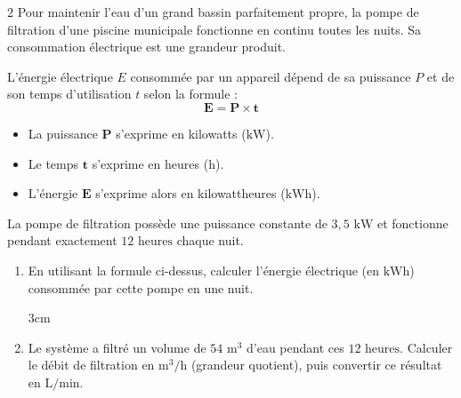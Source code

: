 \documentclass[a4paper]{book}
\begin{document}
{\newpage
    
    
    \begin{exerciceNote}{2}
        Pour maintenir l'eau d'un grand bassin parfaitement propre, la pompe de filtration d'une piscine municipale fonctionne en continu toutes les nuits. Sa consommation électrique est une grandeur produit.
        
        \begin{center}
        \begin{minipage}{0.8\textwidth}
            \begin{tcolorbox}[colback=gray!5,colframe=gray!40,arc=1mm,title=\small Rappel de cours,fonttitle=\bfseries\small,coltitle=black,colbacktitle=gray!20,size=small]
            L'énergie électrique $E$ consommée par un appareil dépend de sa puissance $P$ et de son temps d'utilisation $t$ selon la formule :
            $$\mathbf{E = P \times t}$$
            \begin{itemize}
                \item[$\bullet$] La puissance $\mathbf{P}$ s'exprime en kilowatts ($\text{kW}$).
                \item[$\bullet$] Le temps $\mathbf{t}$ s'exprime en heures ($\text{h}$).
                \item[$\bullet$] L'énergie $\mathbf{E}$ s'exprime alors en kilowattheures ($\text{kWh}$).
            \end{itemize}
            \end{tcolorbox}
        \end{minipage}
        \end{center}
        \medskip
        
        La pompe de filtration possède une puissance constante de $3,5\text{ kW}$ et fonctionne pendant exactement $12\text{ heures}$ chaque nuit.
        \begin{enumerate}
            \item En utilisant la formule ci-dessus, calculer l'énergie électrique (en $\text{kWh}$) consommée par cette pompe en une nuit.
            
            \begin{ZoneReponse}{3cm}
            \end{ZoneReponse}
            
            \item Le système a filtré un volume de $54\text{ m}^3$ d'eau pendant ces $12\text{ heures}$. Calculer le débit de filtration en $\text{m}^3/\text{h}$ (grandeur quotient), puis convertir ce résultat en $\text{L/min}$.
            

\end{enumerate}
\end{exerciceNote}}
\end{document}
